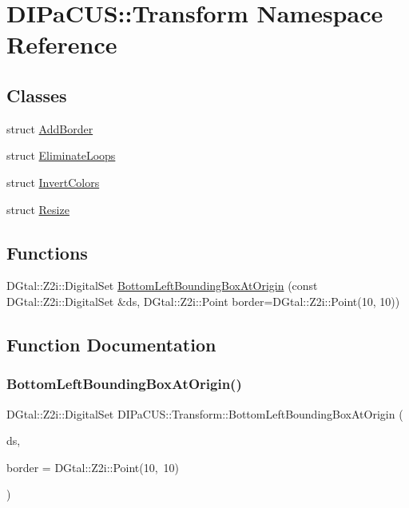 \hypertarget{namespaceDIPaCUS_1_1Transform}{}\section{D\+I\+Pa\+C\+US\+:\+:Transform Namespace Reference}
\label{namespaceDIPaCUS_1_1Transform}
\subsection*{Classes}
\begin{DoxyCompactItemize}
\item 
struct \mbox{\hyperlink{structDIPaCUS_1_1Transform_1_1AddBorder}{Add\+Border}}
\item 
struct \mbox{\hyperlink{structDIPaCUS_1_1Transform_1_1EliminateLoops}{Eliminate\+Loops}}
\item 
struct \mbox{\hyperlink{structDIPaCUS_1_1Transform_1_1InvertColors}{Invert\+Colors}}
\item 
struct \mbox{\hyperlink{structDIPaCUS_1_1Transform_1_1Resize}{Resize}}
\end{DoxyCompactItemize}
\subsection*{Functions}
\begin{DoxyCompactItemize}
\item 
D\+Gtal\+::\+Z2i\+::\+Digital\+Set \mbox{\hyperlink{namespaceDIPaCUS_1_1Transform_aca979f060a7d9744e2ddecf6f88c1702}{Bottom\+Left\+Bounding\+Box\+At\+Origin}} (const D\+Gtal\+::\+Z2i\+::\+Digital\+Set \&ds, D\+Gtal\+::\+Z2i\+::\+Point border=D\+Gtal\+::\+Z2i\+::\+Point(10, 10))
\end{DoxyCompactItemize}


\subsection{Function Documentation}
\mbox{\label{namespaceDIPaCUS_1_1Transform_aca979f060a7d9744e2ddecf6f88c1702}} 
\subsubsection{\texorpdfstring{Bottom\+Left\+Bounding\+Box\+At\+Origin()}{BottomLeftBoundingBoxAtOrigin()}}
{\footnotesize\ttfamily D\+Gtal\+::\+Z2i\+::\+Digital\+Set D\+I\+Pa\+C\+U\+S\+::\+Transform\+::\+Bottom\+Left\+Bounding\+Box\+At\+Origin (\begin{DoxyParamCaption}\item[{const D\+Gtal\+::\+Z2i\+::\+Digital\+Set \&}]{ds,  }\item[{D\+Gtal\+::\+Z2i\+::\+Point}]{border = {\ttfamily DGtal\+:\+:Z2i\+:\+:Point(10,~10)} }\end{DoxyParamCaption})}

